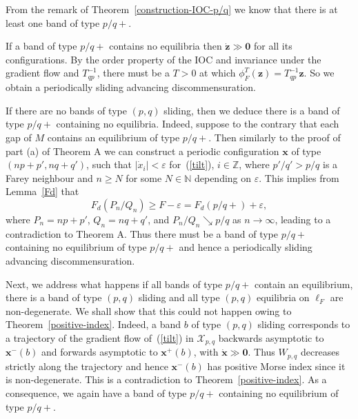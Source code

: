 \documentclass[12pt]{article}
\newcommand{\R}{\mathbb{R}}
\newcommand{\Z}{\mathbb{Z}}
\newcommand{\N}{\mathbb{N}}
\newcommand{\eps}{\varepsilon}
\newcommand{\refer}[1]{~(\ref{#1})}
\newcommand{\zbf}{{\mathbf{z}}}
\newcommand{\xbf}{{\mathbf{x}}}
\newcommand{\zero}{{\mathbf{0}}}
\newcommand{\mcalX}{\mathcal{X}}
\begin{document}
From the remark of Theorem~\ref{construction-IOC-p/q} we know that there is at least one band of type $p/q+$.

If a band of type $p/q+$ contains no equilibria then $\dot{\zbf}\gg \zero$ for all its configurations. By the order property of the IOC and invariance under the gradient flow and $T_{qp}^{-1}$, there must be a $T>0$ at which $\phi^T_F(\zbf) =T_{qp}^{-1}\zbf$.  So we obtain a periodically sliding advancing discommensuration.

If there are no bands of type $(p,q)$ sliding, then %
 we deduce there is a band of type $p/q+$ containing no equilibria. Indeed,
suppose to the contrary that each gap of $M$ contains an equilibrium of type $p/q+$. Then similarly to the proof of part (a) of Theorem A we can construct a periodic configuration $\xbf$ of type $(np+p',nq+q')$, such that $|\dot{x}_i|<\eps$ for\refer{tilt}, $i\in\Z$, where $p'/q'>p/q$ is a Farey neighbour and $n\geq N$ for some $N\in\N$ depending on $\eps$. This implies from Lemma~\ref{Fd} that
$$
F_d(P_n/Q_n)\geq F-\eps= F_d(p/q+)+\eps,
$$
where $P_n=np+p'$, $Q_n=nq+q'$, and $P_n/Q_n\searrow p/q$ as $n\to\infty$, leading to a contradiction to Theorem A.
Thus there must be a band of type $p/q+$ containing no equilibrium of type $p/q+$ and hence a periodically sliding advancing discommensuration.



Next, we address what happens if all bands of type $p/q+$ contain an equilibrium, there is a band of type $(p,q)$ sliding and all type $(p,q)$ equilibria on $\ell_F$ are non-degenerate.  %
We shall show that this could not happen owing to Theorem~\ref{positive-index}. Indeed, a band $b$ of type $(p,q)$ sliding corresponds to a trajectory of the gradient flow of\refer{tilt} in $\mcalX_{p,q}$ %
 backwards asymptotic to $\xbf^-(b)$ and forwards asymptotic to $\xbf^+(b)$, with $\dot{\xbf}\gg \zero$.  Thus $W_{p,q}$ decreases strictly along the trajectory and hence  $\xbf^-(b)$  has positive Morse index since it is non-degenerate. This is a contradiction to Theorem~\ref{positive-index}. As a consequence, we again have  a band of type $p/q+$ containing no equilibrium of type $p/q+$.
 


\end{document}
